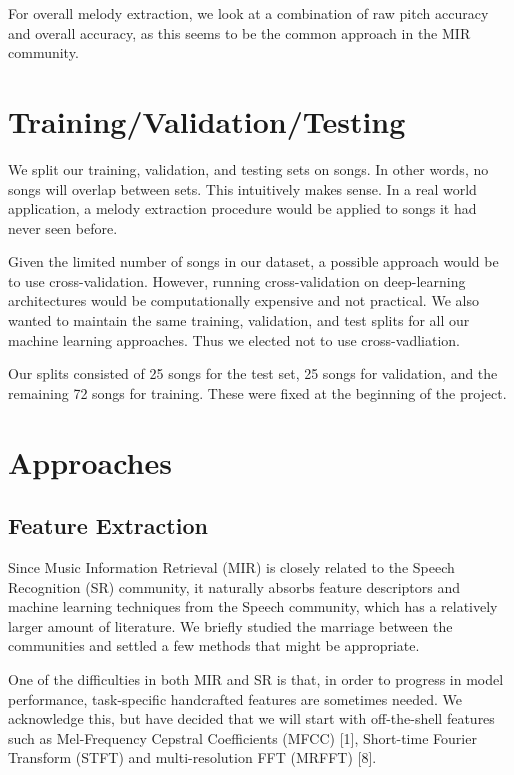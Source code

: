 \documentclass{article} %
\begin{document}
For overall melody extraction, we look at a combination of raw pitch accuracy and overall accuracy, as this seems to be the common approach in the MIR community.

\section{Training/Validation/Testing}

We split our training, validation, and testing sets on songs.  In other words, no songs will overlap between sets.  This intuitively makes sense.  In a real world application, a melody extraction procedure would be applied to songs it had never seen before. 

Given the limited number of songs in our dataset, a possible approach would be to use cross-validation.  However, running cross-validation on deep-learning architectures would be computationally expensive and not practical.  We also wanted to maintain the same training, validation, and test splits for all our machine learning approaches.  Thus we elected not to use cross-vadliation.

Our splits consisted of 25 songs for the test set, 25 songs for validation, and the remaining 72 songs for training.  These were fixed at the beginning of the project.

\section{Approaches}
\subsection{Feature Extraction}
Since Music Information Retrieval (MIR) is closely related to the Speech Recognition (SR) community, it naturally absorbs feature descriptors and 
machine learning techniques from the Speech community, which has a relatively larger amount of literature.
We briefly studied the marriage between the communities and settled a few methods that might be appropriate. 

One of the difficulties in both MIR and SR is that, in order to progress in model performance, task-specific handcrafted features are sometimes needed.  We acknowledge this, but have decided that we will start with off-the-shell features such as Mel-Frequency Cepstral Coefficients (MFCC) [1], Short-time Fourier Transform (STFT) and multi-resolution FFT (MRFFT) [8].
\end{document}
